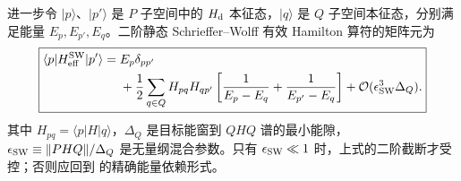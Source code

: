 进一步令 $|p\rangle$、$|p'\rangle$ 是 $P$ 子空间中的 $H_{\rm d}$ 本征态，$|q\rangle$ 是 $Q$ 子空间本征态，分别满足能量 $E_p,E_{p'},E_q$。二阶静态 Schrieffer--Wolff 有效 Hamilton 算符的矩阵元为
\begin{equation}
 \boxed{
 \begin{aligned}
 \langle p|H_{\rm eff}^{\rm SW}|p'\rangle
 ={}&E_p\delta_{pp'}\\
 &+\frac12\sum_{q\in Q}H_{pq}H_{qp'}
 \left[
 \frac1{E_p-E_q}
 +\frac1{E_{p'}-E_q}
 \right]
 +\mathcal O(\epsilon_{\rm SW}^3\Delta_Q).
 \end{aligned}}
 \label{eq:sw_arbitrary_target_subspace_matrix_elements}
\end{equation}
其中 $H_{pq}=\langle p|H|q\rangle$，$\Delta_Q$ 是目标能窗到 $QHQ$ 谱的最小能隙，
$\epsilon_{\rm SW}\equiv\|PHQ\|/\Delta_Q$ 是无量纲混合参数。只有 $\epsilon_{\rm SW}\ll1$ 时，上式的二阶截断才受控；否则应回到 的精确能量依赖形式。
